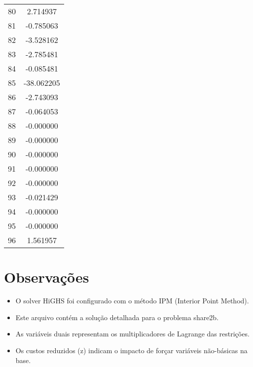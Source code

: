 \documentclass[12pt]{article}
\begin{document}
\begin{longtable}{@{}cc@{}}
80 & 2.714937 \\
81 & -0.785063 \\
82 & -3.528162 \\
83 & -2.785481 \\
84 & -0.085481 \\
85 & -38.062205 \\
86 & -2.743093 \\
87 & -0.064053 \\
88 & -0.000000 \\
89 & -0.000000 \\
90 & -0.000000 \\
91 & -0.000000 \\
92 & -0.000000 \\
93 & -0.021429 \\
94 & -0.000000 \\
95 & -0.000000 \\
96 & 1.561957 \\

\end{longtable}


\section{Observações}

\begin{itemize}
\item O solver HiGHS foi configurado com o método IPM (Interior Point Method).
\item Este arquivo contém a solução detalhada para o problema share2b.
\item As variáveis duais representam os multiplicadores de Lagrange das restrições.
\item Os custos reduzidos (z) indicam o impacto de forçar variáveis não-básicas na base.
\end{itemize}
\end{document}
